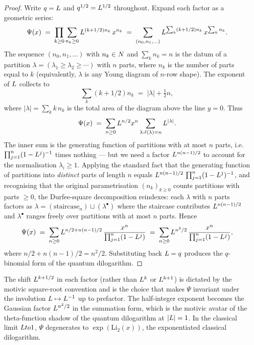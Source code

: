 \begin{proof}
  Write $q = L$ and $q^{1/2} = L^{1/2}$ throughout. Expand each
  factor as a geometric series:
  \[
    \Psi(x) \;=\; \prod_{k \geq 0} \sum_{n_k \geq 0} L^{(k + 1/2) n_k}\, x^{n_k}
            \;=\; \sum_{(n_0, n_1, \ldots)} L^{\sum_k (k + 1/2) n_k}\, x^{\sum_k n_k}.
  \]
  The sequence $(n_0, n_1, \ldots)$ with $n_k \in N$ and $\sum_k n_k = n$ is
  the datum of a partition $\lambda = (\lambda_1 \geq \lambda_2 \geq \cdots)$
  with $n$ parts, where $n_k$ is the number of parts equal to $k$
  (equivalently, $\lambda$ is any Young diagram of $n$-row shape). The
  exponent of $L$ collects to
  \[
    \sum_k (k + 1/2) n_k \;=\; |\lambda| + \tfrac{1}{2} n,
  \]
  where $|\lambda| = \sum_k k\, n_k$ is the total area of the diagram
  above the line $y = 0$. Thus
  \[
    \Psi(x) \;=\; \sum_{n \geq 0} L^{n/2} x^n \sum_{\lambda : \ell(\lambda) = n} L^{|\lambda|}.
  \]
  The inner sum is the generating function of partitions with at most
  $n$ parts, i.e.~$\prod_{j=1}^n (1 - L^j)^{-1}$ times nothing --- but
  we need a factor $L^{n(n-1)/2}$ to account for the normalisation
  $\lambda_i \geq 1$. Applying the standard fact that the generating
  function of partitions into \emph{distinct} parts of length $n$ equals
  $L^{n(n-1)/2}\, \prod_{j=1}^n (1-L^j)^{-1}$, and recognising that
  the original parametrisation $(n_k)_{k \geq 0}$ counts partitions with
  parts $\geq 0$, the Durfee-square decomposition reindexes: each
  $\lambda$ with $n$ parts factors as
  $\lambda = (\mathrm{staircase}_n) \sqcup (\lambda^\bullet)$ where the
  staircase contributes $L^{n(n-1)/2}$ and $\lambda^\bullet$ ranges
  freely over partitions with at most $n$ parts. Hence
  \[
    \Psi(x) \;=\; \sum_{n \geq 0} L^{n/2 + n(n-1)/2}\, \frac{x^n}{\prod_{j=1}^n (1 - L^j)}
            \;=\; \sum_{n \geq 0} L^{n^2/2}\, \frac{x^n}{\prod_{j=1}^n (1 - L^j)},
  \]
  where $n/2 + n(n-1)/2 = n^2/2$. Substituting back $L = q$ produces
  the $q$-binomial form of the quantum dilogarithm.
\end{proof}

\begin{remark}
  The shift $L^{k + 1/2}$ in each factor (rather than $L^k$ or
  $L^{k+1}$) is dictated by the motivic square-root convention and is
  the choice that makes $\Psi$ invariant under the involution
  $L \mapsto L^{-1}$ up to prefactor. The half-integer exponent
  becomes the Gaussian factor $L^{n^2/2}$ in the summation form, which
  is the motivic avatar of the theta-function shadow of the quantum
  dilogarithm at $|L| = 1$. In the classical limit $L to 1$,
  $\Psi$ degenerates to $\exp(\mathrm{Li}_2(x))$, the exponentiated
  classical dilogarithm.
\end{remark}

